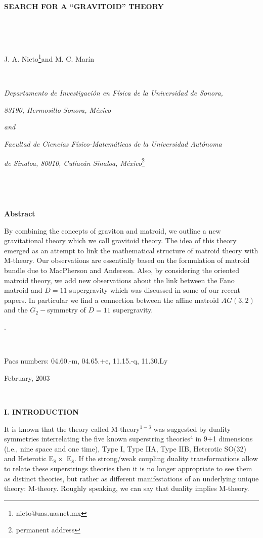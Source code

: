 \documentclass[a4paper,12pt]{article}
\begin{document}
\bigskip

\bigskip\ 

\begin{center}
\textbf{SEARCH FOR A ``GRAVITOID'' THEORY}

\bigskip\ 

\smallskip\ 

J. A. Nieto\footnote[1]{%
nieto@uas.uasnet.mx}and M. C. Mar\'{i}n

\smallskip\ 

\textit{Departamento de Investigaci\'{o}n en F\'{i}sica de la Universidad de
Sonora,}

\textit{83190, Hermosillo Sonora, M\'{e}xico}

\textit{and}

\textit{Facultad de Ciencias F\'{i}sico-Matem\'{a}ticas de la Universidad
Aut\'{o}noma}

\textit{de Sinaloa, 80010, Culiac\'{a}n Sinaloa, M\'{e}xico}\footnote[2]{%
permanent address}

\bigskip\ 

\bigskip\ 

\textbf{Abstract}
\end{center}

By combining the concepts of graviton and matroid, we outline a new
gravitational theory which we call gravitoid theory. The idea of this theory
emerged as an attempt to link the mathematical structure of matroid theory
with M-theory. Our observations are essentially based on the formulation of
matroid bundle due to MacPherson and Anderson. Also, by considering the
oriented matroid theory, we add new observations about the link between the
Fano matroid and $D=11$ supergravity which was discussed in some of our
recent papers. In particular we find a connection between the affine matroid 
$AG(3,2)$ and the $G_{2}-$symmetry of $D=11$ supergravity.

.\bigskip

\bigskip

\bigskip\ 

Pacs numbers: 04.60.-m, 04.65.+e, 11.15.-q, 11.30.Ly

February, 2003

\newpage\ 

\noindent \textbf{I. INTRODUCTION}

\bigskip

It is known that the theory called M-theory$^{1-3}$ was suggested by duality
symmetries interrelating the five known superstring theories$^{4}$ in 9+1
dimensions (i.e., nine space and one time), Type I, Type IIA, Type IIB,
Heterotic SO(32) and Heterotic E$_{8}\times $ E$_{8}.$ If the strong/weak
coupling duality transformations allow to relate these superstrings theories
then it is no longer appropriate to see them as distinct theories, but
rather as different manifestations of an underlying unique theory: M-theory.
Roughly speaking, we can say that duality implies M-theory.
\end{document}
